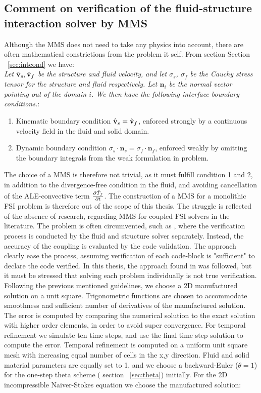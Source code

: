 \subsection*{Comment on verification of the fluid-structure interaction solver by MMS}
Although the MMS does not need to take any physics into account, there are often mathematical constrictions from the problem it self. From section Section ~\ref{sec:intcond} we have: \\
\textit{Let $\hat{\mathbf{v}}_s, \hat{\mathbf{v}}_f$ be the structure and fluid velocity, and let $\sigma_s$, $\sigma_f$ be the Cauchy stress tensor for the structure and fluid respectively. Let $\mathbf{n}_i$ be the normal vector pointing out of the domain $i$. We then have the following interface boundary conditions.}:
\begin{enumerate}
\item Kinematic boundary condition $\hat{\mathbf{v}}_s = \hat{\mathbf{v}}_f$, enforced strongly by a continuous velocity field in the fluid and solid domain.
\item Dynamic boundary condition $\sigma_s \cdot \mathbf{n}_s = \sigma_f \cdot \mathbf{n}_f$, enforced weakly by omitting the boundary integrals from the weak formulation in problem.
\end{enumerate}
The choice of a MMS is therefore not trivial, as it must fulfill condition 1 and 2, in addition to the divergence-free condition in the fluid, and avoiding cancellation of the ALE-convective term $\frac{\partial \hat{T}_f}{\partial t}$.  The construction of a MMS for a monolithic FSI problem is therefore out of the scope of this thesis. The struggle is reflected of the absence of research, regarding MMS for coupled FSI solvers in the literature. The problem is often circumvented, such as \cite{Sheldon2014}, where the verification process is conducted by the fluid and structure solver separately. Instead, the accuracy of the coupling is evaluated by the code validation. The approach clearly ease the process, assuming verification of each code-block is "sufficient" to declare the code verified. In this thesis, the approach found in \cite{Sheldon2014} was followed, but it must be stressed that solving each problem individually is not true verification. \\
Following the previous mentioned guidelines, we choose a 2D manufactured solution on a unit square. Trigonometric functions are chosen to accommodate smoothness and sufficient number of derivatives of the manufactured solution. The error is computed by comparing the numerical solution to the exact solution  with higher order elements, in order to avoid super convergence. For temporal refinement we simulate ten time steps, and use the final time step solution to compute the error. Temporal refinement is computed on a uniform unit square mesh with increasing equal number of cells in the x,y direction. Fluid and solid material parameters are equally set to 1, and we choose a backward-Euler ($\theta = 1$) for the one-step theta scheme ( section ~\ref{sec:theta}) initially. For the 2D incompressible Naiver-Stokes equation we choose the manufactured solution:

